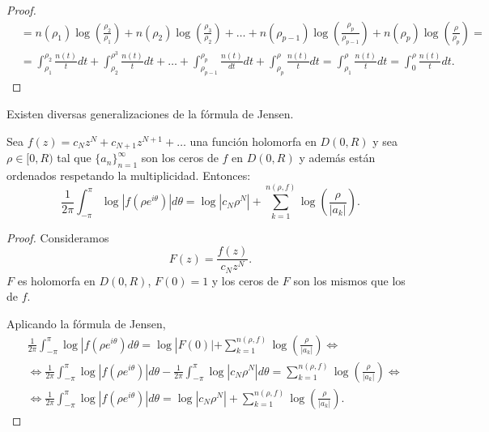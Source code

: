 \begin{remark}
\begin{enumerate}
\begin{proof}
\begin{align*}
                       & = n(\rho_1)\log\left(\frac{\rho_2}{\rho_1}\right) + n(\rho_2)\log\left(\frac{\rho_3}{\rho_2}\right) + \dots + n(\rho_{p-1})\log\left(\frac{\rho_p}{\rho_{p-1}}\right) + n(\rho_p)\log\left(\frac{\rho}{\rho_p}\right) =                                           \\
                       & = \int_{\rho_1}^{\rho_2} \frac{n(t)}{t}dt + \int_{\rho_2}^{\rho^3} \frac{n(t)}{t}dt + \dots + \int_{\rho_{p-1}}^{\rho_p} \frac{n(t)}{dt}dt + \int_{\rho_p}^\rho \frac{n(t)}{t}dt = \int_{\rho_1}^\rho \frac{n(t)}{t}dt = \int_0^\rho \frac{n(t)}{t}dt.
                  \end{align*}
              \end{proof}
    \end{enumerate}
\end{remark}

Existen diversas generalizaciones de la fórmula de Jensen.

\begin{theorem}
    Sea $f(z) = c_Nz^N + c_{N+1}z^{N+1} + \dots$ una función holomorfa en $D(0, R)$ y sea $\rho \in [0, R)$ tal que $\{a_n\}_{n=1}^\infty$ son los ceros de $f$ en $D(0, R)$ y además están ordenados respetando la multiplicidad.
    Entonces:
    $$\frac{1}{2\pi} \int_{-\pi}^\pi \log|f(\rho e^{i\theta})|d\theta = \log|c_N\rho^N| + \sum_{k=1}^{n(\rho, f)} \log\left(\frac{\rho}{|a_k|}\right).$$
\end{theorem}

\begin{proof}
    Consideramos
    $$F(z) = \frac{f(z)}{c_Nz^N}.$$
    $F$ es holomorfa en $D(0, R)$, $F(0) = 1$ y los ceros de $F$ son los mismos que los de $f$.

    Aplicando la fórmula de Jensen,
    \begin{align*}
         & \frac{1}{2\pi} \int_{-\pi}^\pi \log|f(\rho e^{i\theta})d\theta = \log|F(0)| + \sum_{k=1}^{n(\rho, f)} \log\left(\frac{\rho}{|a_k|}\right) \Leftrightarrow                                                             \\
         & \Leftrightarrow \frac{1}{2\pi} \int_{-\pi}^\pi \log|f(\rho e^{i\theta})|d\theta - \frac{1}{2\pi} \int_{-\pi}^\pi \log|c_N\rho^N|d\theta = \sum_{k=1}^{n(\rho, f)} \log\left(\frac{\rho}{|a_k|}\right) \Leftrightarrow \\
         & \Leftrightarrow \frac{1}{2\pi} \int_{-\pi}^\pi \log|f(\rho e^{i\theta})|d\theta = \log|c_N\rho^N| + \sum_{k=1}^{n(\rho, f)} \log\left(\frac{\rho}{|a_k|}\right).
    \end{align*}
\end{proof}

